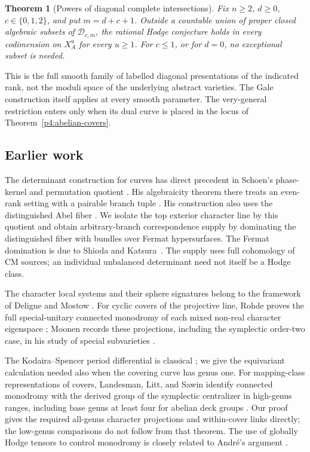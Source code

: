 \documentclass[11pt]{article}
\newcommand{\D}{\mathcal D}
\theoremstyle{plain}
\newtheorem{theorem}{Theorem}[section]
\theoremstyle{definition}
\theoremstyle{remark}
\numberwithin{equation}{section}
\begin{document}
\begin{theorem}[Powers of diagonal complete intersections]
\label{thm:main}
Fix \(n\geq2\),
\(d\geq0\), \(c\in\{0,1,2\}\), and put \(m=d+c+1\).
Outside a countable union of proper closed algebraic subsets of
\(\D_{c,m}\), the rational Hodge conjecture holds in every codimension
on \(X_A^u\) for every \(u\geq1\).  For \(c\leq1\), or for \(d=0\),
no exceptional subset is needed.
\end{theorem}

This is the full smooth family of labelled diagonal presentations of
the indicated rank, not the moduli space of the underlying abstract
varieties.  The Gale construction itself applies at every smooth
parameter.  The very-general restriction enters only when its dual
curve is placed in the locus of Theorem~\ref{p4:abelian-covers}.

\subsection{Earlier work}

The determinant construction for curves has direct precedent in
Schoen's phase-kernel and permutation quotient
\cite[Section~1, Lemmas~1.1--1.2]{Schoen}.  His algebraicity theorem
there treats an even-rank setting with a pairable branch tuple
\cite[Theorem~2.0]{Schoen}.  His construction also uses the distinguished
Abel fiber \cite[Section~2, pp.~12--13]{Schoen}.  We isolate the top
exterior character line by this quotient and obtain arbitrary-branch
correspondence supply by dominating the distinguished fiber with
bundles over Fermat hypersurfaces.
The Fermat domination is due to Shioda and Katsura~\cite{SK}.  The supply
uses full cohomology of CM sources; an individual unbalanced determinant
need not itself be a Hodge class.

The character local systems and their sphere signatures belong to the
framework of Deligne and Mostow
\cite[Corollary~2.21 and Section~2.23]{DeligneMostow1986}.
For cyclic covers of the projective line, Rohde proves the full
special-unitary connected monodromy of each mixed non-real character eigenspace
\cite[preprint, Theorem~5.1.1]{Rohde2009}; Moonen records these
projections, including the symplectic order-two case, in his study of
special subvarieties \cite[Proposition~4.7]{Moonen2010}.

The Kodaira--Spencer period differential is classical
\cite[Theorem~1.27]{Griffiths1968PeriodsII}; we give the equivariant
calculation needed also when the covering curve has genus one.  For
mapping-class representations of covers, Landesman, Litt, and Sawin
identify connected monodromy with the derived group of the symplectic
centralizer in high-genus ranges, including base genus at least four
for abelian deck groups \cite[Theorem~1.3]{LandesmanLittSawin2025}.
Our proof gives the required all-genus character projections and
within-cover links directly; the low-genus comparisons do not follow
from that theorem.  The use of globally Hodge tensors to control
monodromy is closely related to Andr\'e's argument
\cite[Section~4, Lemma~4]{Andre1992FixedPart}.
\end{document}
